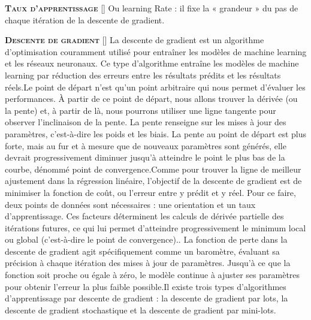 \documentclass[10pt,french]{report}
\newcommand{\cube}{\raisebox{0.13ex}{\scalebox{0.75}{ $\blacksquare$ }}}
\newcommand{\entreelex}[3][]{%
	{\large \textbf{\textsc{#2}}} %
	\if\relax\detokenize{#1}\relax %
	\else %
	\raisebox{0.15ex}{\scalebox{0.7}{$\Diamond$}} %
	[#1] %
	\fi
	\raisebox{0.13ex}{\scalebox{0.75}{$\blacksquare$}} #3 %
}
\begin{document}
	\label{taux apprentissag}
	\entreelex{Taux d'apprentissage}{Ou learning Rate : il fixe la « grandeur » du pas de chaque itération de la descente de gradient.}

	\entreelex{Descente de gradient}{La descente de gradient est un algorithme d'optimisation couramment utilisé pour entraîner les modèles de machine learning et les réseaux neuronaux. Ce type d'algorithme entraîne les modèles de machine learning par réduction des erreurs entre les résultats prédits et les résultats réels.\cube Le point de départ n'est qu'un point arbitraire qui nous permet d'évaluer les performances. À partir de ce point de départ, nous allons trouver la dérivée (ou la pente) et, à partir de là, nous pourrons utiliser une ligne tangente pour observer l'inclinaison de la pente. La pente renseigne sur les mises à jour des paramètres, c'est-à-dire les poids et les biais. La pente au point de départ est plus forte, mais au fur et à mesure que de nouveaux paramètres sont générés, elle devrait progressivement diminuer jusqu'à atteindre le point le plus bas de la courbe, dénommé point de convergence.\cube Comme pour trouver la ligne de meilleur ajustement dans la régression linéaire, l'objectif de la descente de gradient est de minimiser la fonction de coût, ou l'erreur entre y prédit et y réel. Pour ce faire, deux points de données sont nécessaires : une orientation et un taux d'apprentissage. Ces facteurs déterminent les calculs de dérivée partielle des itérations futures, ce qui lui permet d'atteindre progressivement le minimum local ou global (c'est-à-dire le point de convergence).. La fonction de perte dans la descente de gradient agit spécifiquement comme un baromètre, évaluant sa précision à chaque itération des mises à jour de paramètres. Jusqu'à ce que la fonction soit proche ou égale à zéro, le modèle continue à ajuster ses paramètres pour obtenir l'erreur la plus faible possible.\cube Il existe trois types d'algorithmes d'apprentissage par descente de gradient : la descente de gradient par lots, la descente de gradient stochastique et la descente de gradient par mini-lots.}

	\listoffigures

    \printbibliography
\end{document}
